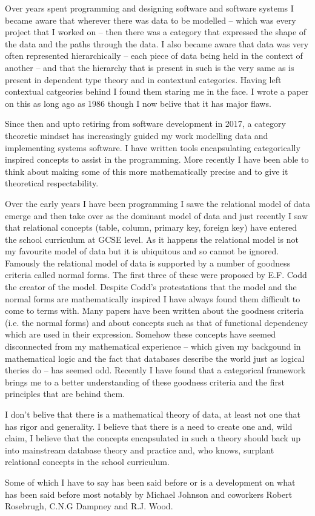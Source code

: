 \documentclass[12pt,a4paper]{article}
\begin{document}
Over years spent programming and designing software and software systems I became aware
that wherever there was data to be modelled -- which was every project that I worked on -- then there was a category that expressed the shape of the data and the paths through the data.  
I also became aware that data was very often represented hierarchically 
-- each piece of data being held in the context of another -- and that the hierarchy that is present in  such is the very same as is present in dependent type theory and in contextual categories.
Having left contextual catgeories behind I found them staring me in the face.
I wrote a paper on this as long ago as 1986 though I now belive that it has major flaws. 

Since then and upto retiring from software development in 2017, a category theoretic mindset has increasingly guided my work modelling data and implementing  systems software. I have written  tools 
encapsulating categorically inspired concepts  to assist in the programming. More recently I have been able to think about  making some of this more mathematically precise and  to give it  theoretical respectability. 

Over the early years I have been programming I sawe the relational model of data emerge 
and then take over as the dominant model of data 
and just recently I saw that relational concepts (table, column, primary key, foreign key) 
have entered the school curriculum at GCSE level.  
As it happens the relational model is not my favourite model of data but it is ubiquitous and so cannot be ignored. Famously the relational model of data is supported by a number of goodness criteria called normal forms. The first three of these were proposed by E.F. Codd the creator of the model. 
Despite Codd's protestations that the model and the normal forms are mathematically inspired I have 
always found them difficult to come to terms with. 
Many papers have been written about the goodness criteria (i.e. the normal forms) 
and about concepts such as that of functional dependency
which are used in their expression. Somehow these concepts have seemed disconnected from my mathematical experience -- which given my backgound in mathematical logic 
and the fact that databases describe the world just as logical theries do -- has seemed odd. 
Recently I have found that a categorical framework brings me to a better understanding of these 
goodness criteria and the first principles that are behind them. 

I don't belive that there is a mathematical theory of data, at least not one that has rigor and generality. 
I believe that there is a need to create one and, wild claim,  I believe that the concepts encapsulated in such a theory should back up into mainstream database theory and practice and, who knows, surplant relational concepts in the school curriculum.

Some of which I have to say has been said before or is a development on what has been said before
most notably by Michael Johnson and coworkers Robert Rosebrugh, C.N.G Dampney and R.J. Wood.
\end{document}
